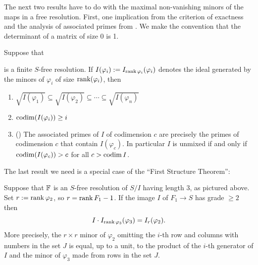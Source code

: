 \documentclass[11pt]{amsart}
\def\phi{{\varphi}}
\begin{document}
The next two results have to do with the maximal non-vanishing minors of the
maps in a free resolution. First, one implication from the criterion of exactness and the analysis of associated primes  from \cite{WMACE}. We make the convention that the determinant of a matrix of size 0 is 1.

\begin{theorem} \cite{WMACE}\label{WMACE}
Suppose that
 \begin{center}
\end{center}
is a finite $S$-free resolution. If $I(\phi_{i}) := I_{\rank \phi_{i}}(\phi_{i})$ denotes the ideal generated by the minors of $\phi_i$ of size $\rank(\phi_{i})$, then
\begin{enumerate}
\item $\sqrt{I(\phi_{1})} \subseteq  \sqrt{I(\phi_{2})} \subseteq  \cdots \subseteq \sqrt{I(\phi_{n})}$
\item $\codim (I(\phi_{i}))\geq i$
\item (\cite[Theorem~1.1(1) and Remark~(2), pp.~215--217]{EHV}) The associated primes of $I$  of codimension $c$ are precisely the primes
of codimension $c$ that contain $I(\phi_{c})$. In particular $I$ is unmixed
if and only if $\codim (I(\phi_{c})) > c$ for all $c>\operatorname{codim} I$.
\end{enumerate}
\end{theorem}

The last result we need is a special case of the ``First Structure Theorem'':
\begin{theorem}\cite[Theorem~3.1]{structure} \label{structure}
Suppose that ${\mathbb F}$ is an $S$-free resolution of $S/I$ having length 3, as pictured above.
Set $r := \rank \phi_2$, so $r = \operatorname{rank} F_1 -1$. If
the image $I$ of $F_{1} \to S$ has grade $\geq 2$ then
$$
I\cdot I_{\rank \phi_{3}} (\phi_{3}) = I_r(\phi_{2}).
$$
More precisely, the $r\times r$ minor of $\phi_{2}$ omitting the $i$-th row
and columns with numbers in the set $J$ is equal, up to a unit, to the product of the $i$-th generator of $I$ and
the minor of $\phi_{3}$ made from rows in the set $J$.
\end{theorem}
\end{document}
